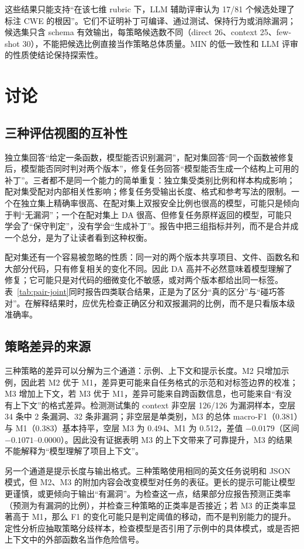 \documentclass[conference]{IEEEtran}
\begin{document}
这些结果只能支持“在该七维 rubric 下，LLM 辅助评审认为 17/81 个候选处理了标注 CWE 的根因”。它们不证明补丁可编译、通过测试、保持行为或消除漏洞；候选集只含 schema 有效输出，每策略候选数不同（direct 26、context 25、few-shot 30），不能把候选比例直接当作策略总体质量。MIN 的低一致性和 LLM 评审的性质使结论保持探索性。

\section{讨论}
\label{sec:discussion}

\subsection{三种评估视图的互补性}
独立集回答“给定一条函数，模型能否识别漏洞”，配对集回答“同一个函数被修复后，模型能否同时判对两个版本”，修复任务回答“模型能否生成一个结构上可用的补丁”。三者都不是同一个能力的简单重复：独立集受类别比例和样本构成影响；配对集受配对内部相关性影响；修复任务受输出长度、格式和参考写法的限制。一个在独立集上精确率很高、在配对集上双报安全比例也很高的模型，可能只是倾向于判“无漏洞”；一个在配对集上 DA 很高、但修复任务原样返回的模型，可能只学会了“保守判定”，没有学会“生成补丁”。报告中把三组指标并列，而不是合并成一个总分，是为了让读者看到这种权衡。

配对集还有一个容易被忽略的性质：同一对的两个版本共享项目、文件、函数名和大部分代码，只有修复相关的变化不同。因此 DA 高并不必然意味着模型理解了修复；它可能只是对代码的细微变化不敏感，或对两个版本都给出同一标签。表~\ref{tab:pair-joint}同时报告四类联合结果，正是为了区分“真的区分”与“碰巧答对”。在解释结果时，应优先检查正确区分和双报漏洞的比例，而不是只看版本级准确率。

\subsection{策略差异的来源}
三种策略的差异可以分解为三个通道：示例、上下文和提示长度。M2 只增加示例，因此若 M2 优于 M1，差异更可能来自任务格式的示范和对标签边界的校准；M3 增加上下文，若 M3 优于 M1，差异可能来自跨函数信息，也可能来自“有没有上下文”的格式差异。检测测试集的 context 非空层 126/126 为漏洞样本，空层 34 条中 2 条漏洞、32 条非漏洞；非空层是单类别，M3 的总体 macro-F1（0.381）与 M1（0.383）基本持平，空层 M3 为 0.494、M1 为 0.512，差值 $-0.0179$（区间 $-0.1071$--0.0000）。因此没有证据表明 M3 的上下文带来了可靠提升，M3 的结果不能解释为“模型理解了项目上下文”。

另一个通道是提示长度与输出格式。三种策略使用相同的英文任务说明和 JSON 模式，但 M2、M3 的附加内容会改变模型对任务的表征。更长的提示可能让模型更谨慎，或更倾向于输出“有漏洞”。为检查这一点，结果部分应报告预测正类率（预测为有漏洞的比例），并检查三种策略的正类率是否接近；若 M3 的正类率显著高于 M1，那么 F1 的变化可能只是判定阈值的移动，而不是判别能力的提升。定性分析应抽取策略分歧样本，检查模型是否引用了示例中的具体模式，或是否把上下文中的外部函数名当作危险信号。
\end{document}
